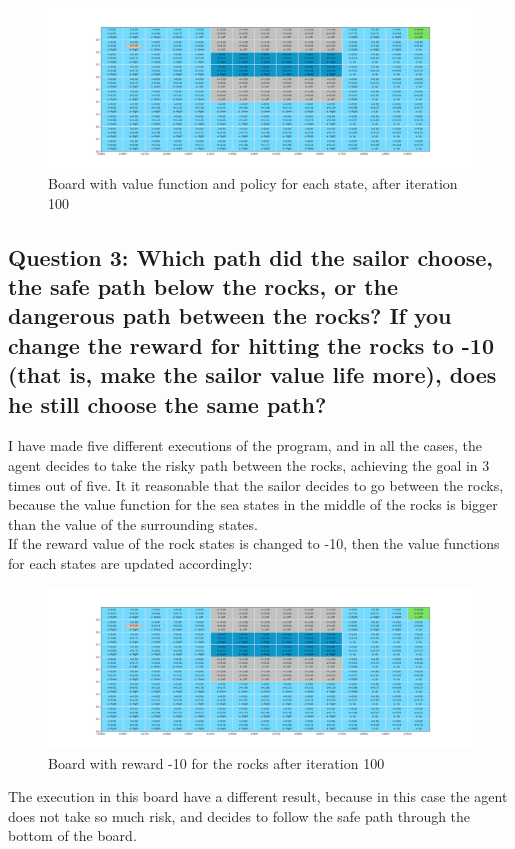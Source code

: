 \documentclass[12pt]{article}
\begin{document}
\begin{figure}[H]
    \centering
    \includegraphics[scale=0.25]{exercise-2/report/img/final-board-with-policy.png}
    \caption{Board with value function and policy for each state, after iteration 100}
    \label{fig:pol-final-board}
\end{figure}

\subsection{Question 3: Which path did the sailor choose, the safe path below the rocks, or the dangerous path between the rocks? If you change the reward for hitting the rocks to -10 (that is, make the sailor value life more), does he still choose the same path?}

I have made five different executions of the program, and in all the cases, the agent decides to take the risky path between the rocks, achieving the goal in 3 times out of five. It it reasonable that the sailor decides to go between the rocks, because the value function for the sea states in the middle of the rocks is bigger than the value of the surrounding states. \\

If the reward value of the rock states is changed to -10, then the value functions for each states are updated accordingly:

\begin{figure}[H]
    \centering
    \includegraphics[scale=0.25]{exercise-2/report/img/final-board-with-policy-2.png}
    \caption{Board with reward -10 for the rocks after iteration 100}
    \label{fig:pol-final-board}
\end{figure}

The execution in this board have a different result, because in this case the agent does not take so much risk, and decides to follow the safe path through the bottom of the board. 


\end{document}
